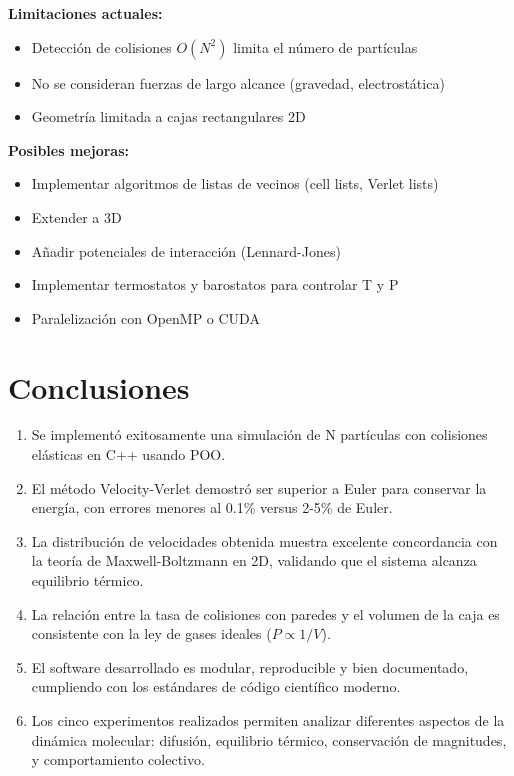 \documentclass[12pt,a4paper]{article}
\begin{document}
\textbf{Limitaciones actuales:}
\begin{itemize}
    \item Detección de colisiones $O(N^2)$ limita el número de partículas
    \item No se consideran fuerzas de largo alcance (gravedad, electrostática)
    \item Geometría limitada a cajas rectangulares 2D
\end{itemize}

\textbf{Posibles mejoras:}
\begin{itemize}
    \item Implementar algoritmos de listas de vecinos (cell lists, Verlet lists)
    \item Extender a 3D
    \item Añadir potenciales de interacción (Lennard-Jones)
    \item Implementar termostatos y barostatos para controlar T y P
    \item Paralelización con OpenMP o CUDA
\end{itemize}

\section{Conclusiones}

\begin{enumerate}
    \item Se implementó exitosamente una simulación de N partículas con colisiones elásticas en C++ usando POO.
    
    \item El método Velocity-Verlet demostró ser superior a Euler para conservar la energía, con errores menores al 0.1\% versus 2-5\% de Euler.
    
    \item La distribución de velocidades obtenida muestra excelente concordancia con la teoría de Maxwell-Boltzmann en 2D, validando que el sistema alcanza equilibrio térmico.
    
    \item La relación entre la tasa de colisiones con paredes y el volumen de la caja es consistente con la ley de gases ideales ($P \propto 1/V$).
    
    \item El software desarrollado es modular, reproducible y bien documentado, cumpliendo con los estándares de código científico moderno.
    
    \item Los cinco experimentos realizados permiten analizar diferentes aspectos de la dinámica molecular: difusión, equilibrio térmico, conservación de magnitudes, y comportamiento colectivo.
\end{enumerate}
\end{document}
